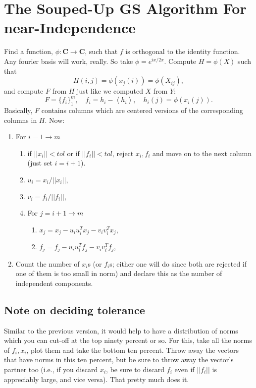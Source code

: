 \documentclass[reqno]{amsart}
\newcommand{\norm}[1]{\left| \left| #1 \right| \right|}
\newcommand{\mean}[1]{\left \langle #1 \right \rangle}
\newcommand{\f}{\phi}
\begin{document}
\section{The Souped-Up GS Algorithm For near-Independence}
Find a function, $\f: \mathbf{C} \to \mathbf{C}$, such that $f$ is orthogonal to the identity function. Any fourier basis will work, really. So take $\f = e^{i x / 2 \pi}$. Compute $H = \f(X)$ such that
\[ H(i, j) = \f(x_j (i)) = \f(X_{ij}),\]
and compute $F$ from $H$ just like we computed $X$ from $Y$:
\[ F = \{ f_i \}_1 ^m, \quad f_i = h_i - \mean{h_i}, \quad h_i (j) = \f(x_i (j)). \]
Basically, $F$ contains columns which are centered versions of the corresponding columns in $H$. Now:
\begin{enumerate}
\item For $i = 1 \to m$
\begin{enumerate}
\item if $\norm{x_i} < tol$ or if $\norm{f_i} < tol$, reject $x_i, f_i$ and move on to the next column (just set $i = i+1$).
\item $u_i = x_i / \norm{x_i}$,
\item $v_i = f_i / \norm{f_i}$,
\item For $j = i+1 \to m$
\begin{enumerate}
\item $x_j = x_j - u_i u_i ^T x_j - v_i v_i ^T x_j$,
\item $f_j = f_j - u_i u_i ^T f_j - v_i v_i ^T f_j$,
\end{enumerate}
\end{enumerate}
\item Count the number of $x_i$s (or $f_i$s; either one will do since both are rejected if one of them is too small in norm) and declare this as the number of independent components.
\end{enumerate}

\subsection{Note on deciding tolerance}
Similar to the previous version, it would help to have a distribution of norms which you can cut-off at the top ninety percent or so. For this, take all the norms of $f_i, x_i$, plot them and take the bottom ten percent. Throw away the vectors that have norms in this ten percent, but be sure to throw away the vector's partner too (i.e., if you discard $x_i$, be sure to discard $f_i$ even if $\norm{f_i}$ is appreciably large, and vice versa). That pretty much does it.
\end{document}
